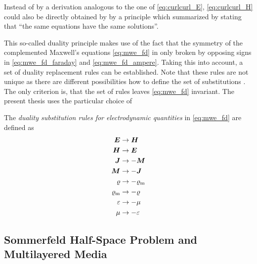 Instead of by a derivation analogous to the one of \eqref{eq:curlcurl_E},
\eqref{eq:curlcurl_H} could also be directly obtained by by a principle
which \textcite[\S12-1]{Feynman2011} summarized by stating that
\enquote{the same equations have the same solutions}.

This so-called duality principle makes use of the fact that the symmetry of the
complemented Maxwell's equations \eqref{eq:mwe_fd} in only broken by
opposing signs in \eqref{eq:mwe_fd_faraday} and \eqref{eq:mwe_fd_ampere}.
Taking this into account, a set of duality replacement rules can be established.
Note that these rules are not unique as there are different possibilities how
to define the set of substitutions \cite{Jin2015,Harrington2001,Chew1999}.
The only criterion is, that the set of rules leaves \eqref{eq:mwe_fd} invariant.
The present thesis uses the particular choice of 
\begin{definition}
	The \emph{duality substitution rules for electrodynamic quantities} in
	\eqref{eq:mwe_fd} are defined as \cite[p.~9]{Chew1999}
	\begin{subequations}
		\begin{align}
		\pvec{E} &\to \pvec{H} \\
		\pvec{H} &\to \pvec{E} \\
		\pvec{J} &\to -\pvec{M} \\
		\pvec{M} &\to -\pvec{J} \\
		\varrho &\to -\varrho_\mathrm{m} \\
		\varrho_\mathrm{m} &\to -\varrho \\
		\varepsilon &\to -\mu \\
		\mu &\to -\varepsilon 
		\end{align}
	\end{subequations}
\end{definition}

\subsection{Sommerfeld Half-Space Problem and Multilayered Media}

	
		
		
